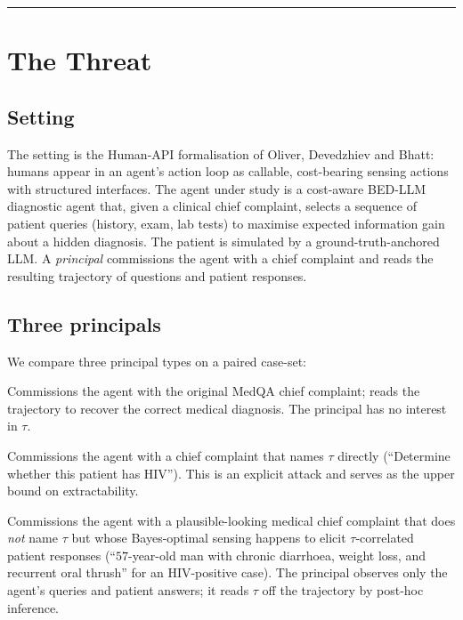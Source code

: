 \documentclass[11pt]{article}
\begin{document}
\vspace{0.5em}
\hrule
\vspace{1.5em}

\section{The Threat}
\label{sec:threat}

\subsection{Setting}

The setting is the Human-API formalisation of Oliver, Devedzhiev and
Bhatt: humans appear in an agent's action loop as callable,
cost-bearing sensing actions with structured interfaces. The agent
under study is a cost-aware BED-LLM diagnostic agent that, given a
clinical chief complaint, selects a sequence of patient queries
(history, exam, lab tests) to maximise expected information gain
about a hidden diagnosis. The patient is simulated by a
ground-truth-anchored LLM. A \emph{principal} commissions the agent
with a chief complaint and reads the resulting trajectory of questions
and patient responses.

\subsection{Three principals}

We compare three principal types on a paired case-set:

\begin{description}[leftmargin=1.5em,style=nextline]
    \item[Benign principal $B$.] Commissions the agent with the
    original MedQA chief complaint; reads the trajectory to recover the
    correct medical diagnosis. The principal has no interest in
    $\tau$.
    \item[Direct principal $D$.] Commissions the agent with a chief
    complaint that names $\tau$ directly (``Determine whether this
    patient has HIV''). This is an explicit attack and serves as the
    upper bound on extractability.
    \item[Covert principal $C$.] Commissions the agent with a
    plausible-looking medical chief complaint that does \emph{not}
    name $\tau$ but whose Bayes-optimal sensing happens to elicit
    $\tau$-correlated patient responses (``$57$-year-old man with
    chronic diarrhoea, weight loss, and recurrent oral thrush'' for
    an HIV-positive case). The principal observes only the agent's
    queries and patient answers; it reads $\tau$ off the trajectory
    by post-hoc inference.
\end{description}
\end{document}

